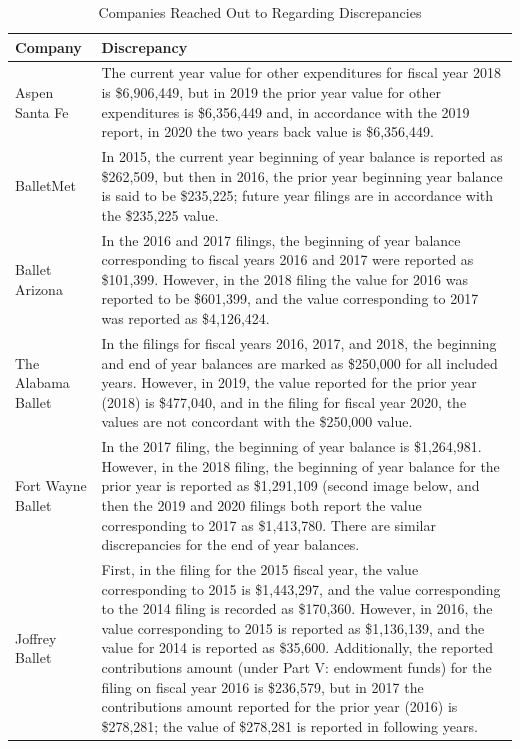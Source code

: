 \documentclass[Dance Data
Project,article,submit,moreauthors,pdftex]{mdpi}
\begin{document}
\begin{table}[H]

\caption{\label{tab:unnamed-chunk-1}\label{table:discrep}Companies Reached Out to Regarding Discrepancies}
\centering
\begin{tabular}[t]{l>{\raggedright\arraybackslash}p{35em}}
\toprule
Company & Discrepancy\\
\midrule
Aspen Santa Fe & The current year value for other expenditures for fiscal year 2018 is \$6,906,449, but in 2019 the prior year value for other expenditures is \$6,356,449 and, in accordance with the 2019 report, in 2020 the two years back value is \$6,356,449.\\
\addlinespace
BalletMet & In 2015, the current year beginning of year balance is reported as \$262,509, but then in 2016, the prior year beginning year balance is said to be \$235,225; future year filings are in accordance with the \$235,225 value.\\
\addlinespace
Ballet Arizona & In the 2016 and 2017 filings, the beginning of year balance corresponding to fiscal years 2016 and 2017 were reported as \$101,399. However, in the 2018 filing the value for 2016 was reported to be \$601,399, and the value corresponding to 2017 was reported as \$4,126,424.\\
\addlinespace
The Alabama Ballet & In the filings for fiscal years 2016, 2017, and 2018,  the beginning and end of year balances are marked as \$250,000 for all included years. However, in 2019, the value reported for the prior year (2018)  is \$477,040, and in the filing for fiscal year 2020, the values are not concordant with the \$250,000 value.\\
\addlinespace
Fort Wayne Ballet & In the 2017 filing, the beginning of year balance is \$1,264,981. However, in the 2018 filing, the beginning of year balance for the prior year is reported as \$1,291,109 (second image below, and then the 2019 and 2020 filings both report the value corresponding to 2017 as \$1,413,780. There are similar discrepancies for the end of year balances.\\
\addlinespace
Joffrey Ballet & First, in the filing for the 2015 fiscal year, the value corresponding to 2015 is \$1,443,297, and the value corresponding to the 2014 filing is recorded as \$170,360.  However, in 2016, the value corresponding to 2015 is reported as \$1,136,139, and the value for 2014 is reported as \$35,600. Additionally, the reported contributions amount (under Part V: endowment funds)  for the filing on fiscal year 2016 is \$236,579, but in 2017 the contributions amount reported for the prior year (2016) is \$278,281; the value of \$278,281 is reported in following years.\\

\end{tabular}
\end{table}
\end{document}
